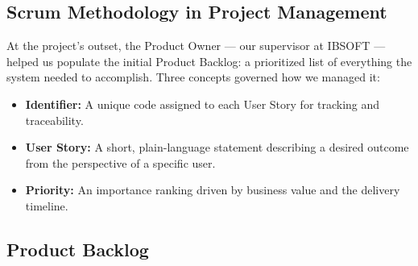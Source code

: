 \documentclass[12pt,a4paper,oneside]{report}
\begin{document}
\subsection{Scrum Methodology in Project Management}
\label{subsec:scrum_mgmt}

\hspace{0.8cm}At the project's outset, the Product Owner — our supervisor at IBSOFT — helped us populate the initial Product Backlog: a prioritized list of everything the system needed to accomplish. Three concepts governed how we managed it:
\begin{itemize}
  \item \textbf{Identifier:} A unique code assigned to each User Story for tracking and traceability.
  \item \textbf{User Story:} A short, plain-language statement describing a desired outcome from the perspective of a specific user.
  \item \textbf{Priority:} An importance ranking driven by business value and the delivery timeline.
\end{itemize}

\subsection{Product Backlog}
\label{subsec:product_backlog}
\end{document}
